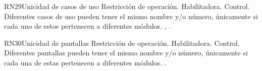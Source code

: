 \begin{BussinesRule}{RN29}{Unicidad de casos de uso} 
	\BRitem[Tipo:] Restricción de operación. 
	\BRitem[Clase:] Habilitadora. 
	\BRitem[Nivel:] Control. %
	\BRitem[Descripción:] Diferentes casos de uso pueden tener el mismo nombre y/o número, únicamente si cada uno de estos pertenecen a diferentes módulos.
	 , . 
\end{BussinesRule}

\begin{BussinesRule}{RN30}{Unicidad de pantallas} 
	\BRitem[Tipo:] Restricción de operación. 
	\BRitem[Clase:] Habilitadora. 
	\BRitem[Nivel:] Control. %
	\BRitem[Descripción:] Diferentes pantallas pueden tener el mismo nombre y/o número, únicamente si cada una de estas pertenecen a diferentes módulos.
	 \UCref{}{}. 
\end{BussinesRule}


